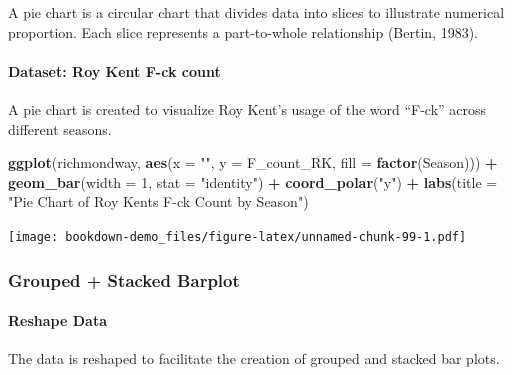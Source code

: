 \documentclass[
  b5paper]{book}
\newenvironment{Shaded}{\begin{snugshade}}{\end{snugshade}}
\newcommand{\AttributeTok}[1]{\textcolor[rgb]{0.13,0.29,0.53}{#1}}
\newcommand{\DecValTok}[1]{\textcolor[rgb]{0.00,0.00,0.81}{#1}}
\newcommand{\FunctionTok}[1]{\textcolor[rgb]{0.13,0.29,0.53}{\textbf{#1}}}
\newcommand{\NormalTok}[1]{#1}
\newcommand{\SpecialCharTok}[1]{\textcolor[rgb]{0.81,0.36,0.00}{\textbf{#1}}}
\newcommand{\StringTok}[1]{\textcolor[rgb]{0.31,0.60,0.02}{#1}}
\begin{document}
A pie chart is a circular chart that divides data into slices to illustrate numerical proportion. Each slice represents a part-to-whole relationship (Bertin, 1983).

\hypertarget{dataset-roy-kent-f-ck-count}{%
\paragraph{Dataset: Roy Kent F-ck count}\label{dataset-roy-kent-f-ck-count}}

A pie chart is created to visualize Roy Kent's usage of the word ``F-ck'' across different seasons.

\begin{Shaded}
\begin{Highlighting}[]
\FunctionTok{ggplot}\NormalTok{(richmondway, }\FunctionTok{aes}\NormalTok{(}\AttributeTok{x =} \StringTok{""}\NormalTok{, }\AttributeTok{y =}\NormalTok{ F\_count\_RK, }\AttributeTok{fill =} \FunctionTok{factor}\NormalTok{(Season))) }\SpecialCharTok{+}
  \FunctionTok{geom\_bar}\NormalTok{(}\AttributeTok{width =} \DecValTok{1}\NormalTok{, }\AttributeTok{stat =} \StringTok{"identity"}\NormalTok{) }\SpecialCharTok{+}
  \FunctionTok{coord\_polar}\NormalTok{(}\StringTok{"y"}\NormalTok{) }\SpecialCharTok{+}
  \FunctionTok{labs}\NormalTok{(}\AttributeTok{title =} \StringTok{"Pie Chart of Roy Kent\textquotesingle{}s F{-}ck Count by Season"}\NormalTok{)}
\end{Highlighting}
\end{Shaded}

\texttt{[image: bookdown-demo\_files/figure-latex/unnamed-chunk-99-1.pdf]}

\hypertarget{grouped-stacked-barplot}{%
\subsubsection*{Grouped + Stacked Barplot}\label{grouped-stacked-barplot}}

\hypertarget{reshape-data}{%
\paragraph*{Reshape Data}\label{reshape-data}}

The data is reshaped to facilitate the creation of grouped and stacked bar plots.
\end{document}
